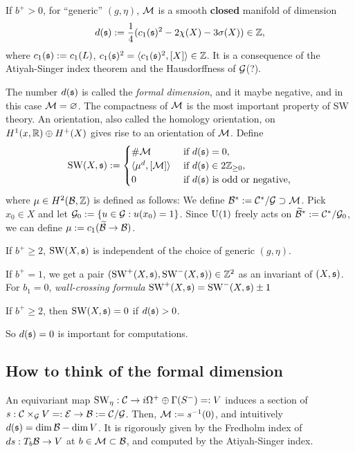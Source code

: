 \documentclass{../../../small}
\begin{document}
\begin{theorem}
If $b^+>0$, for ``generic'' $(g,\eta)$, $\mathcal{M}$ is a smooth \textbf{closed} manifold of dimension
\[d(\mathfrak{s}):=\frac14(c_1(\mathfrak{s})^2-2\chi(X)-3\sigma(X))\in\mathbb{Z},\]
where $c_1(\mathfrak{s}):=c_1(L)$, $c_1(\mathfrak{s})^2=\langle c_1(\mathfrak{s})^2,[X]\rangle\in\mathbb{Z}$.
It is a consequence of the Atiyah-Singer index theorem and the Hausdorffness of $\mathcal{G}$(?).
\end{theorem}

The number $d(\mathfrak{s})$ is called the \emph{formal dimension}, and it maybe negative, and in this case $\mathcal{M}=\varnothing$.
The compactness of $\mathcal{M}$ is the most important property of SW theory.
An orientation, also called the homology orientation, on $H^1(x,\mathbb{R})\oplus H^+(X)$ gives rise to an orientation of $\mathcal{M}$.
Define
\[\mathrm{SW}(X,\mathfrak{s}):=\begin{cases}
\#\mathcal{M}&\text{ if }d(\mathfrak{s})=0,\\
\langle\mu^d,[\mathcal{M}]\rangle&\text{ if }d(\mathfrak{s})\in2\mathbb{Z}_{\ge0},\\
0&\text{ if }d(\mathfrak{s})\text{ is odd or negative,}
\end{cases}\]
where $\mu\in H^2(\mathcal{B},\mathbb{Z})$ is defined as follows:
We define $\mathcal{B}^*:=\mathcal{C}^*/\mathcal{G}\supset\mathcal{M}$.
Pick $x_0\in X$ and let $\mathcal{G}_0:=\{u\in\mathcal{G}:u(x_0)=1\}$.
Since $\mathrm{U}(1)$ freely acts on $\widetilde{\mathcal{B}}^*:=\mathcal{C}^*/\mathcal{G}_0$, we can define $\mu:=c_1(\widetilde{\mathcal{B}}\to\mathcal{B})$.


\begin{theorem}
If $b^+\ge2$, $\mathrm{SW}(X,\mathfrak{s})$ is independent of the choice of generic $(g,\eta)$.
\end{theorem}
\begin{remark}
If $b^+=1$, we get a pair $(\mathrm{SW}^+(X,\mathfrak{s}),\mathrm{SW}^-(X,\mathfrak{s}))\in\mathbb{Z}^2$ as an invariant of $(X,\mathfrak{s})$.
For $b_1=0$, \emph{wall-crossing formula} $\mathrm{SW}^+(X,\mathfrak{s})=\mathrm{SW}^-(X,\mathfrak{s})\pm1$
\end{remark}

\begin{remark}
If $b^+\ge2$, then $\mathrm{SW}(X,\mathfrak{s})=0$ if $d(\mathfrak{s})>0$.
\end{remark}

So $d(\mathfrak{s})=0$ is important for computations.



\subsection{How to think of the formal dimension}

An equivariant map $\mathrm{SW}_\eta:\mathcal{C}\to i\Omega^+\oplus\Gamma(S^-)=:V$ induces a section of $s:\mathcal{C}\times_{\mathcal{G}} V=:\mathcal{E}\to\mathcal{B}:=\mathcal{C}/\mathcal{G}$.
Then, $\mathcal{M}:=s^{-1}(0)$, and intuitively $d(\mathfrak{s})=\dim\mathcal{B}-\dim V$.
It is rigorously given by the Fredholm index of $ds:T_b\mathcal{B}\to V$ at $b\in\mathcal{M}\subset\mathcal{B}$, and computed by the Atiyah-Singer index.
\end{document}
